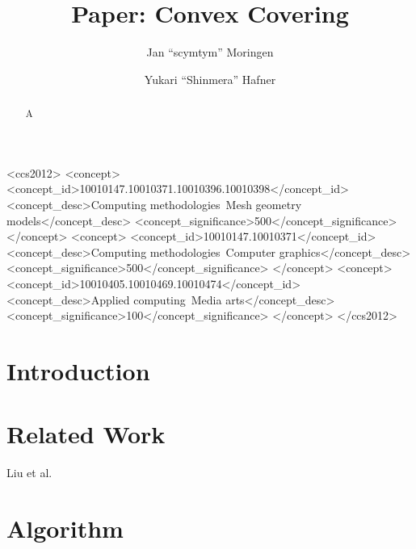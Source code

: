 \documentclass[format=sigconf]{acmart}
\begin{document}
\title{Paper: Convex Covering}

\author{Jan ``scymtym'' Moringen}
\author{Yukari ``Shinmera'' Hafner}

\begin{CCSXML}
  <ccs2012>
  <concept>
  <concept_id>10010147.10010371.10010396.10010398</concept_id>
  <concept_desc>Computing methodologies~Mesh geometry models</concept_desc>
  <concept_significance>500</concept_significance>
  </concept>
  <concept>
  <concept_id>10010147.10010371</concept_id>
  <concept_desc>Computing methodologies~Computer graphics</concept_desc>
  <concept_significance>500</concept_significance>
  </concept>
  <concept>
  <concept_id>10010405.10010469.10010474</concept_id>
  <concept_desc>Applied computing~Media arts</concept_desc>
  <concept_significance>100</concept_significance>
  </concept>
  </ccs2012>
\end{CCSXML}


\begin{abstract}
  A
\end{abstract}


\maketitle

\def\abovecaptionskip{1pt}
\def\listingautorefname{Listing}
\def\figureautorefname{Figure}

\section{Introduction}\label{introduction}

\section{Related Work}\label{relatedwork}

Liu et al.\cite{liu2008convex}

\section{Algorithm}\label{algorithm}
\end{document}
